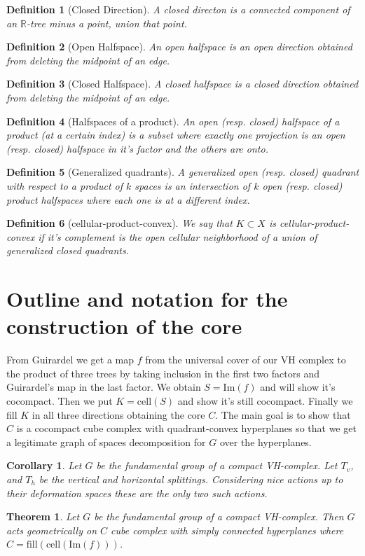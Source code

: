 \documentclass{article}
\theoremstyle{mystyle}
\newtheorem{thm}{Theorem}[section]
\newtheorem{defn}{Definition}
\newtheorem*{cor*}{Corollary}
\theoremstyle{remark}
\begin{document}
\begin{defn}[Closed Direction] A closed directon is a connected component of an \(\mathbb{R}\)-tree minus a point, union that point.
\end{defn}
\begin{defn}[Open Halfspace] An open halfspace is an open direction obtained from deleting the midpoint of an edge.
\end{defn}
\begin{defn}[Closed Halfspace] A closed halfspace is a closed direction obtained from deleting the midpoint of an edge.
\end{defn}
\begin{defn}[Halfspaces of a product] An open (resp. closed) halfspace of a product (at a certain index) is a subset where exactly one projection is an open (resp. closed)  halfspace in it's factor and the others are onto.
\end{defn}
\begin{defn}[Generalized quadrants] A generalized open (resp. closed) quadrant with respect to a product of \(k\) spaces is an intersection of \(k\) open (resp. closed) product halfspaces where each one is at a different index.
\end{defn}
\begin{defn}[cellular-product-convex] We say that \(K \subset X\) is cellular-product-convex if it's complement is the open cellular neighborhood of a union of generalized closed quadrants.
\end{defn}



\section{Outline and notation for the construction of the core}

    From Guirardel we get a map \(f\) from the universal cover of our VH complex to the product of three trees by taking inclusion in the first two factors and Guirardel's map in the last factor. We obtain \(S = \text{Im}(f)\) and will show it's cocompact. Then we put \(K = \text{cell}{(S)}\) and show it's still cocompact. Finally we fill \(K\) in all three directions obtaining the core \(C\). The main goal is to show that \(C\) is a cocompact cube complex with quadrant-convex hyperplanes so that we get a legitimate graph of spaces decomposition for \(G\) over the hyperplanes.


\begin{cor*}
    Let \(G\) be the fundamental group of a compact VH-complex. Let \(T_{v}\), and \(T_{h}\) be the vertical and horizontal splittings. Considering {\em nice} actions up to their deformation spaces these are the only two such actions.
\end{cor*}
\begin{thm}
    Let \(G\) be the fundamental group of a compact VH-complex. Then \(G\) acts geometrically on \(C\) cube complex with simply connected hyperplanes where \(C = \text{fill}( \text{cell}( \text{Im}(f) ) )\).
\end{thm}
\end{document}
